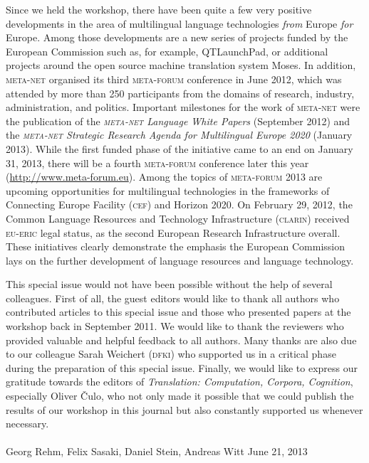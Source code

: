 \documentclass[output=paper]{LSP/langsci}
\begin{document}
Since we held the workshop, there have been quite a few very positive
developments in the area of multilingual language technologies
\emph{from} Europe \emph{for} Europe. Among those developments are a
new series of projects funded by the European Commission such as, for
example, QTLaunchPad, or additional projects around the open source
machine translation system Moses. In addition, \textsc{meta-net} organised its
third \textsc{meta-forum} conference in June 2012, which was attended by more
than 250 participants from the domains of research, industry, administration, and
politics. Important milestones for the work of \textsc{meta-net} were the
publication of the \emph{\textsc{meta-net} Language White Papers} (September
2012) and the \emph{\textsc{meta-net} Strategic Research Agenda for
  Multilingual Europe 2020} (January 2013). While the first funded
phase of the initiative came to an end on January 31, 2013, there will
be a fourth \textsc{meta-forum} conference later this year
(\url{http://www.meta-forum.eu}). Among the topics of \textsc{meta-forum} 2013
are upcoming opportunities for multilingual technologies in the
frameworks of Connecting Europe Facility (\textsc{cef}) and Horizon
2020. On February 29, 2012, the Common Language Resources
and Technology Infrastructure (\textsc{clarin}) received \textsc{eu-eric} legal
status, as the second
European Research Infrastructure overall. These initiatives clearly demonstrate the emphasis the
European Commission lays on the further development of language
resources and language technology.

This special issue would not have been possible without the help of
several colleagues. First of all, the guest editors would like to
thank all authors who contributed articles to this special issue and
those who presented papers at the workshop back in September 2011. We
would like to thank the reviewers who provided valuable and helpful
feedback to all authors. Many thanks are also due to our colleague
Sarah Weichert (\textsc{dfki}) who supported us in a critical phase during the
preparation of this special issue. Finally, we would like to express
our gratitude towards the editors of \emph{Translation: Computation,
  Corpora, Cognition}, especially Oliver Čulo, who not only made it
possible that we could publish the results of our workshop in this
journal but also constantly supported us whenever necessary.\\\\
 
\noindent Georg Rehm, Felix Sasaki, Daniel Stein, Andreas Witt \hfill
June 21, 2013


\printbibliography[heading=subbibliography,notkeyword=this]
\end{document}
